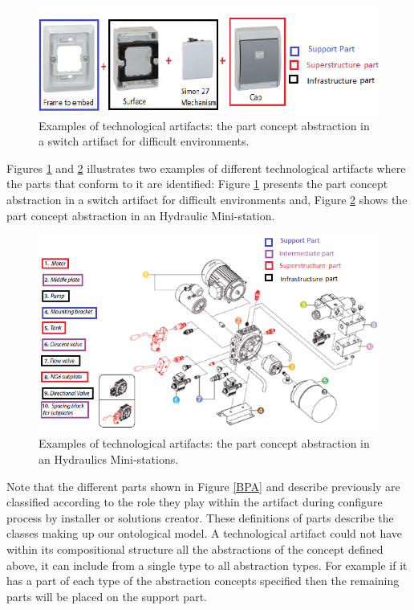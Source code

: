 \documentclass[runningheads,a4paper]{llncs}
\begin{document}
\begin{figure}[h]
\centering
\includegraphics[scale=0.9]{TP.png}
\caption{Examples of technological artifacts: the part concept abstraction in a switch artifact for difficult environments.}\label{TP}
\end{figure}
Figures \ref{TP} and \ref{TP2} illustrates two examples of different technological artifacts where the parts that conform to it are identified: Figure \ref{TP} presents the part concept abstraction in a switch artifact for difficult environments and, Figure \ref{TP2} shows the part concept abstraction in an Hydraulic Mini-station.  
\begin{figure}[h]
\centering
\includegraphics[scale=0.6]{E2.png}
\caption{Examples of technological artifacts: the part concept abstraction in an Hydraulics Mini-stations.}\label{TP2}
\end{figure}

Note that the different parts shown in Figure \ref{BPA} and describe previously are  classified according to the role they play within the artifact during configure process by installer or solutions creator. These definitions of parts describe the classes making up our ontological model. A technological artifact could not have within its compositional structure all the abstractions of the concept defined above, it can include from a single type to all abstraction types. For example if it has a part of each type of the abstraction concepts specified then the remaining parts will be placed on the support part. 
\end{document}
